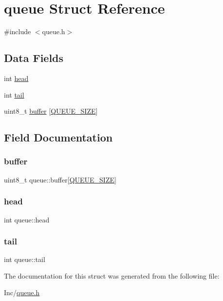 \hypertarget{structqueue}{}\section{queue Struct Reference}
\label{structqueue}


{\ttfamily \#include $<$queue.\+h$>$}

\subsection*{Data Fields}
\begin{DoxyCompactItemize}
\item 
int \hyperlink{structqueue_addac3ae41c0d5c800223eeafacd14007}{head}
\item 
int \hyperlink{structqueue_a0965c88ff3001379629047592b0d208b}{tail}
\item 
uint8\+\_\+t \hyperlink{structqueue_af13e7f3867887f439c6f5b4620d9534a}{buffer} \mbox{[}\hyperlink{queue_8h_a142810068f1b99cd93d3fc9f0e160e02}{Q\+U\+E\+U\+E\+\_\+\+S\+I\+ZE}\mbox{]}
\end{DoxyCompactItemize}


\subsection{Field Documentation}
\mbox{\label{structqueue_af13e7f3867887f439c6f5b4620d9534a}} 
\subsubsection{\texorpdfstring{buffer}{buffer}}
{\footnotesize\ttfamily uint8\+\_\+t queue\+::buffer\mbox{[}\hyperlink{queue_8h_a142810068f1b99cd93d3fc9f0e160e02}{Q\+U\+E\+U\+E\+\_\+\+S\+I\+ZE}\mbox{]}}

\mbox{\label{structqueue_addac3ae41c0d5c800223eeafacd14007}} 
\subsubsection{\texorpdfstring{head}{head}}
{\footnotesize\ttfamily int queue\+::head}

\mbox{\label{structqueue_a0965c88ff3001379629047592b0d208b}} 
\subsubsection{\texorpdfstring{tail}{tail}}
{\footnotesize\ttfamily int queue\+::tail}



The documentation for this struct was generated from the following file\+:\begin{DoxyCompactItemize}
\item 
Inc/\hyperlink{queue_8h}{queue.\+h}\end{DoxyCompactItemize}
